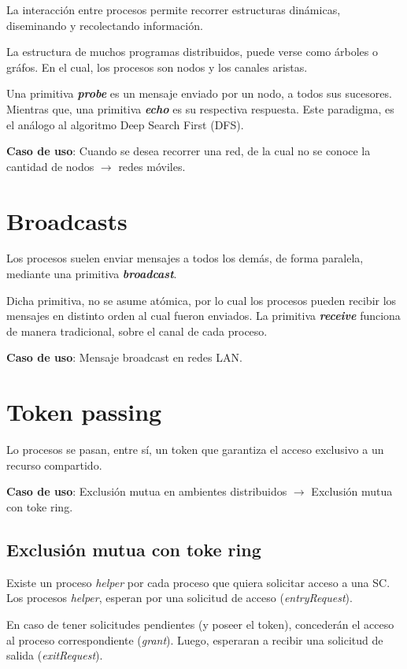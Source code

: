 \documentclass[a4paper, 10pt]{report}
\begin{document}
La interacción entre procesos permite recorrer estructuras dinámicas, diseminando y recolectando información.

La estructura de muchos programas distribuidos, puede verse como árboles o gráfos. En el cual, los procesos son nodos y los canales aristas.

Una primitiva \textbf{\emph{probe}} es un mensaje enviado por un nodo, a todos sus sucesores. Mientras que, una primitiva \textbf{\emph{echo}} es su respectiva respuesta. Este paradigma, es el análogo al algoritmo Deep Search First (DFS).

\textbf{Caso de uso}: Cuando se desea recorrer una red, de la cual no se conoce la cantidad de nodos $\rightarrow$ redes móviles.

\section{Broadcasts}

Los procesos suelen enviar mensajes a todos los demás, de forma paralela, mediante una primitiva \textbf{\emph{broadcast}}. 

Dicha primitiva, no se asume atómica, por lo cual los procesos pueden recibir los mensajes en distinto orden al cual fueron enviados. La primitiva \textbf{\emph{receive}} funciona de manera tradicional, sobre el canal de cada proceso.

\textbf{Caso de uso}: Mensaje broadcast en redes LAN.

\section{Token passing}

Lo procesos se pasan, entre sí, un token que garantiza el acceso exclusivo a un recurso compartido.

\textbf{Caso de uso}: Exclusión mutua en ambientes distribuidos $\rightarrow$ Exclusión mutua con toke ring.

\subsection{Exclusión mutua con toke ring}

Existe un proceso \emph{helper} por cada proceso que quiera solicitar acceso a una SC. Los procesos \emph{helper}, esperan por una solicitud de acceso (\emph{entryRequest}).

En caso de tener solicitudes pendientes (y poseer el token), concederán el acceso al proceso correspondiente (\emph{grant}). Luego, esperaran a recibir una solicitud de salida (\emph{exitRequest}).
\end{document}
